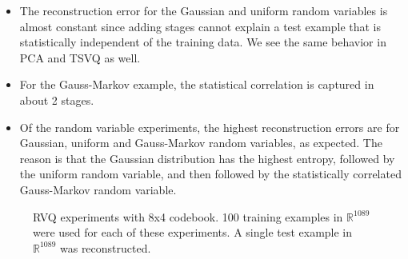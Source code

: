 \begin{itemize}
\item The reconstruction error for the Gaussian and uniform random variables is almost constant since adding stages cannot explain a test example that is statistically independent of the training data.  We see the same behavior in PCA and TSVQ as well.
\item For the Gauss-Markov example, the statistical correlation is captured in about 2 stages.
\item Of the random variable experiments, the highest reconstruction errors are for Gaussian, uniform and Gauss-Markov random variables, as expected.  The reason is that the Gaussian distribution has the highest entropy, followed by the uniform random variable, and then followed by the statistically correlated Gauss-Markov random variable.
\end{itemize}

\begin{figure}
\hspace{0.2in}
\hspace{0.55in}
\caption{RVQ experiments with 8x4 codebook. 100 training examples in $\mathbb{R}^{1089}$ were used for each of these experiments.  A single test example in $\mathbb{R}^{1089}$ was reconstructed.}
\label{fig:RVQ_results}
\end{figure}

